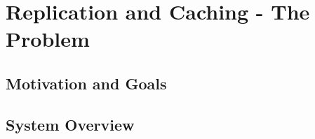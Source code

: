 \chapter{Replication and Caching  - The Problem}
\label{cha:replication}

\section{Motivation and Goals}
\label{}

\section{System Overview}
\label{}